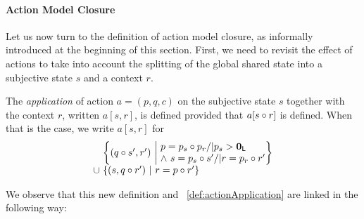 \paragraph{Action Model Closure}
Let us now turn to the definition of action model closure, as informally introduced at the beginning of this section. First, we need to revisit the effect of actions to take into account the splitting of the global shared state into a subjective state $s$ and a context $r$.
%
%
\begin{definition}\label{def:actionApplicationPair}
The \emph{application} of action $a = (p, q, c)$ on the subjective state $s$ together with the context $r$, written $a[s,r]$, is defined provided that $a[s \circ r]$ is defined.
%
When that is the case, we write $a[s,r]$ for
\[
\begin{array}{l @{\hspace{3pt}} l}
	& \left\{ 
		\left(q \composeL s',r'\right) \ \middle|  
		\begin{array}{@{\hspace{3pt}} l @{} }
			p = p_s\composeL p_r /| p_s > \unitL \\
  		\land\ s = p_s \composeL s' /|   r = p_r \composeL r' 
		\end{array}
	\right\}\\
	\cup&
	\left\{ 
		\left(s, q\composeL r'\right) \ \middle|\
  		r =p \composeL r' 
	\right\}
\end{array}
\]
\end{definition}
%
%
\noindent We observe that this new definition and ~\ref{def:actionApplication} are linked in the following way: 
